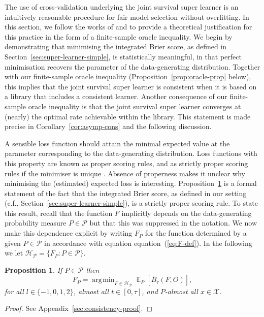 \documentclass[a4paper,danish]{article}
\theoremstyle{plain} %
\numberwithin{theorem}{section}
\newtheorem{proposition}[theorem]{Proposition}
\theoremstyle{definition} %
\theoremstyle{remark}
\DeclareMathOperator{\E}{\mathbb{E}} %
\newcommand{\1}{\mathds{1}}
\DeclareMathOperator*{\argmin}{\arg\!\min}
\begin{document}
The use of cross-validation underlying the joint survival super
learner is an intuitively reasonable procedure for fair model
selection without overfitting. In this section, we follow the works of
\cite{van2003unicv} and \cite{vaart2006oracle} to provide a
theoretical justification for this practice in the form of a
finite-sample oracle inequality. We begin by demonstrating that
minimising the integrated Brier score, as defined in
Section~\ref{sec:super-learner-simple}, is statistically meaningful,
in that perfect minimisation recovers the parameter of the
data-generating distribution. Together with our finite-sample oracle
inequality (Proposition~\ref{prop:oracle-prop} below), this implies
that the joint survival super learner is consistent when it is based
on a library that includes a consistent learner. Another consequence
of our finite-sample oracle inequality is that the joint survival
super learner converges at (nearly) the optimal rate achievable within
the library. This statement is made precise in
Corollary~\ref{cor:asymp-cons} and the following discussion.

A sensible loss function should attain the minimal expected value at
the parameter corresponding to the data-generating distribution. Loss
functions with this property are known as proper scoring rules, and as
strictly proper scoring rules if the minimiser is unique
\citep{gneiting2007strictly}. Absence of properness makes it unclear
why minimising the (estimated) expected loss is interesting.
Proposition~\ref{prop:stric-prop} is a formal statement of the fact
that the integrated Brier score, as defined in our setting (c.f.,
Section~\ref{sec:super-learner-simple}), is a strictly proper scoring
rule. To state this result, recall that the function \(F\) implicitly
depends on the data-generating probability measure \(P\in\mathcal P\)
but that this was suppressed in the notation. We now make this
dependence explicit by writing \(F_P\) for the function determined by
a given \(P \in\mathcal{P}\) in accordance with equation
equation~(\ref{eq:F-def}). In the following we let
\( \mathcal{H}_{\mathcal{P}} = \{F_P : P \in \mathcal{P}\} \).

\begin{proposition}
  \label{prop:stric-prop}
  If \(P \in\mathcal{P}\) then
  \begin{equation*}
    F_P = \argmin_{F \in \mathcal{H}_{\mathcal{P}}}
    \E_P{[\bar{B}_\tau(F, O)]}
    ,
  \end{equation*}
  for all \( l \in \{-1, 0, 1, 2 \} \), almost all
  \( t \in [0,\tau] \), and \( P \)-almost all
  \( x \in \mathcal{X} \).
\end{proposition}
\begin{proof}
  See Appendix~\ref{sec:consistency-proof}.
\end{proof}
\end{document}
